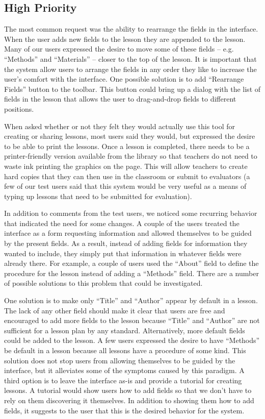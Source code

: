 \documentclass[10pt,letter]{article}
\begin{document}
\subsection{High Priority}
The most common request was the ability to rearrange the fields in the
interface. When the user adds new fields to the lesson they are appended to the
lesson. Many of our users expressed the desire to move some of these fields --
e.g. ``Methods'' and ``Materials'' -- closer to the top of the lesson. It is
important that the system allow users to arrange the fields in any order they
like to increase the user's comfort with the interface. One possible solution is
to add ``Rearrange Fields'' button to the toolbar. This button could bring up a
dialog with the list of fields in the lesson that allows the user to
drag-and-drop fields to different positions.

When asked whether or not they felt they would actually use this tool for
creating or sharing lessons, most users said they would, but expressed the
desire to be able to print the lessons. Once a lesson is completed, there needs
to be a printer-friendly version available from the library so that teachers do
not need to waste ink printing the graphics on the page. This will allow
teachers to create hard copies that they can then use in the classroom or submit
to evaluators (a few of our test users said that this system would be very
useful as a means of typing up lessons that need to be submitted for evaluation).

In addition to comments from the test users, we noticed some recurring behavior
that indicated the need for some changes. A couple of the users treated the
interface as a form requesting information and allowed themselves to be guided
by the present fields. As a result, instead of adding fields for information
they wanted to include, they simply put that information in whatever fields were
already there. For example, a couple of users used the ``About'' field to define
the procedure for the lesson instead of adding a ``Methods'' field. There are a
number of possible solutions to this problem that could be investigated.

One solution is to make only ``Title'' and ``Author'' appear by default in a
lesson.  The lack of any other field should make it clear that users are free
and encouraged to add more fields to the lesson because ``Title'' and ``Author''
are not sufficient for a lesson plan by any standard. Alternatively, more
default fields could be added to the lesson. A few users expressed the desire to
have ``Methods'' be default in a lesson because all lessons have a procedure of
some kind. This solution does not stop users from allowing themselves to be
guided by the interface, but it alleviates some of the symptoms caused by this
paradigm. A third option is to leave the interface as-is and provide a tutorial
for creating lessons. A tutorial would show users how to add fields so that we
don't have to rely on them discovering it themselves. In addition to showing
them how to add fields, it suggests to the user that this is the desired
behavior for the system.
\end{document}
